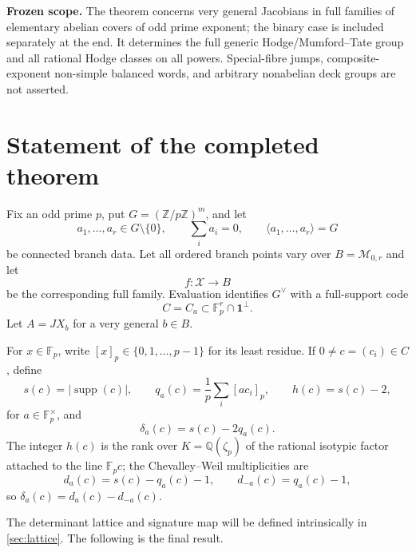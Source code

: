 \documentclass[11pt]{article}
\theoremstyle{definition}
\theoremstyle{remark}
\newcommand{\Q}{\mathbb Q}
\newcommand{\Z}{\mathbb Z}
\newcommand{\F}{\mathbb F}
\newcommand{\M}{\mathcal M}
\newcommand{\supp}{\operatorname{supp}}
\newcommand{\one}{\mathbf 1}
\begin{document}
\medskip
\noindent\textbf{Frozen scope.}
The theorem concerns very general Jacobians in full families of elementary abelian covers of odd prime exponent; the binary case is included separately at the end.  It determines the full generic Hodge/Mumford--Tate group and all rational Hodge classes on all powers.  Special-fibre jumps, composite-exponent non-simple balanced words, and arbitrary nonabelian deck groups are not asserted.

\tableofcontents

\section{Statement of the completed theorem}

Fix an odd prime $p$, put $G=(\Z/p\Z)^m$, and let
\begin{equation}\label{eq:branch}
 a_1,\ldots,a_r\in G\setminus\{0\},\qquad
 \sum_i a_i=0,\qquad
 \langle a_1,\ldots,a_r\rangle=G
\end{equation}
be connected branch data.  Let all ordered branch points vary over $B=\M_{0,r}$ and let
\[
 f:\mathcal X\longrightarrow B
\]
be the corresponding full family.  Evaluation identifies $G^\vee$ with a full-support code
\begin{equation}\label{eq:code}
 C=C_a\subset\F_p^r\cap\one^\perp.
\end{equation}
Let $A=JX_b$ for a very general $b\in B$.

For $x\in\F_p$, write $[x]_p\in\{0,1,\ldots,p-1\}$ for its least residue.  If $0\ne c=(c_i)\in C$, define
\begin{equation}\label{eq:signature-data}
 s(c)=|\supp(c)|,\qquad
 q_a(c)=\frac1p\sum_i[ac_i]_p,\qquad
 h(c)=s(c)-2,
\end{equation}
for $a\in\F_p^\times$, and
\begin{equation}\label{eq:delta}
 \delta_a(c)=s(c)-2q_a(c).
\end{equation}
The integer $h(c)$ is the rank over $K=\Q(\zeta_p)$ of the rational isotypic factor attached to the line $\F_pc$; the Chevalley--Weil multiplicities are
\begin{equation}\label{eq:CW}
 d_a(c)=s(c)-q_a(c)-1,\qquad
 d_{-a}(c)=q_a(c)-1,
\end{equation}
so $\delta_a(c)=d_a(c)-d_{-a}(c)$.

The determinant lattice and signature map will be defined intrinsically in \cref{sec:lattice}.  The following is the final result.
\end{document}

